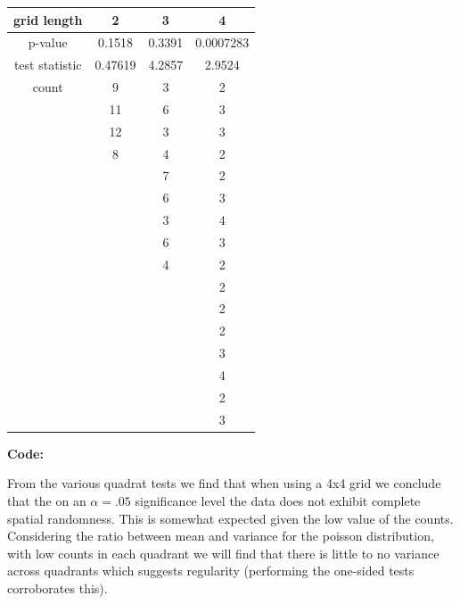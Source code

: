 \documentclass[12pt]{article}
\makeatletter
\theoremstyle{homework}
\newenvironment{exercise}[1]
{\def\@currentlabel{#1}\exercisecore}
{\endexercisecore}
\makeatother
\begin{document}
\begin{exercise}{1}
  \begin{center}
    \begin{tabular}{c|| c c c}
        grid length & 2 & 3 & 4\\
      \hline 
      p-value        & 0.1518  &  0.3391 & 0.0007283\\
      test statistic & 0.47619 & 4.2857  & 2.9524\\
      count          & 9       &   3     & 2\\
                     & 11      &   6     & 3\\
                     & 12      &   3     & 3\\
                     & 8       &   4     & 2\\
                     &         &   7     & 2\\
                     &         &   6     & 3\\
                     &         &   3     & 4\\
                     &         &   6     & 3\\
                     &         &   4     & 2\\  
                     &         &         & 2\\          
                     &         &         & 2\\          
                     &         &         & 2\\        
                     &         &         & 3\\ 
                     &         &         & 4\\          
                     &         &         & 2\\          
                     &         &         & 3          
     \end{tabular}
    \end{center}
    \textbf{Code:}
    \begin{center}
    
    \end{center}

    From the various quadrat tests we find that when using a 4x4 grid we conclude that the on an $\alpha = .05$
    significance level the data does not exhibit complete spatial randomness. This is somewhat expected given the low value of the counts. 
    Considering the ratio between mean and variance for the poisson distribution, with low counts in each quadrant we will find that there is little to no variance across quadrants
    which suggests regularity (performing the one-sided tests corroborates this).
\end{exercise}
\vspace{.5in}
\end{document}
